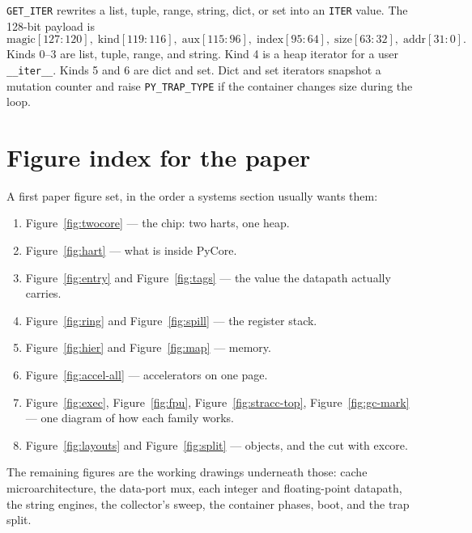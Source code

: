 \documentclass[11pt,a4paper]{article}
\begin{document}
\texttt{GET\_ITER} rewrites a list, tuple, range, string, dict, or set into
an \texttt{ITER} value.
The 128-bit payload is
\[
  \mathrm{magic}[127{:}120],\;
  \mathrm{kind}[119{:}116],\;
  \mathrm{aux}[115{:}96],\;
  \mathrm{index}[95{:}64],\;
  \mathrm{size}[63{:}32],\;
  \mathrm{addr}[31{:}0].
\]
Kinds 0--3 are list, tuple, range, and string.
Kind 4 is a heap iterator for a user \texttt{\_\_iter\_\_}.
Kinds 5 and 6 are dict and set.
Dict and set iterators snapshot a mutation counter and raise
\texttt{PY\_TRAP\_TYPE} if the container changes size during the loop.

\section{Figure index for the paper}
\label{sec:index}

A first paper figure set, in the order a systems section usually wants them:

\begin{enumerate}
\item Figure~\ref{fig:twocore} --- the chip: two harts, one heap.
\item Figure~\ref{fig:hart} --- what is inside PyCore.
\item Figure~\ref{fig:entry} and Figure~\ref{fig:tags} --- the value the
      datapath actually carries.
\item Figure~\ref{fig:ring} and Figure~\ref{fig:spill} --- the register stack.
\item Figure~\ref{fig:hier} and Figure~\ref{fig:map} --- memory.
\item Figure~\ref{fig:accel-all} --- accelerators on one page.
\item Figure~\ref{fig:exec}, Figure~\ref{fig:fpu}, Figure~\ref{fig:stracc-top},
      Figure~\ref{fig:gc-mark} --- one diagram of how each family works.
\item Figure~\ref{fig:layouts} and Figure~\ref{fig:split} --- objects, and
      the cut with excore.
\end{enumerate}

The remaining figures are the working drawings underneath those: cache
microarchitecture, the data-port mux, each integer and floating-point
datapath, the string engines, the collector's sweep, the container phases,
boot, and the trap split.
\end{document}

